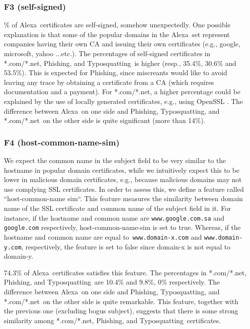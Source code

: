 \documentclass[twocolumn]{article}
\newcommand{\Alexa}{\textsf{Alexa}}
\newcommand{\phishing}{\textsf{Phishing}}
\newcommand{\typosquatting}{\textsf{Typosquatting}}
\newcommand{\comnet}{\textsf{*.com/*.net}}
\begin{document}
\subsubsection*{F3 (self-signed)} \% of \Alexa\
certificates are self-signed, somehow unexpectedly. One possible explanation is that some of the popular domains in 
the  \Alexa\ set represent companies having their own CA and issuing their own certificates (e.g., google, microsoft, yahoo ...etc.).
The percentages of self-signed certificates in \comnet, \phishing, and \typosquatting\ is higher (resp.,  35.4\%, 30.6\% and 53.5\%). 
This is expected for \phishing, since miscreants would like to avoid leaving any trace by obtaining a certificate from a 
CA (which requires documentation and a payment). For \comnet, a higher percentage could be explained  by the use of locally generated certificates, e.g.,  using OpenSSL \cite{openSSL}.
The difference between \Alexa\ on one side and \phishing, \typosquatting, and \comnet\ on the other side is quite significant (more than 14\%). 


\subsubsection*{F4 (host-common-name-sim)}\noindent 
We expect the common name in the subject field to be very similar to the hostname in popular domain certificates, while
we intuitively expect this to be lower in malicious domain certificates, e.g., because malicious domains may not use
complying SSL certificates. In order to assess this, we define a feature called ``host-common-name sim``. This feature 
measures the similarity between domain name of the SSL certificate and common name of the subject field in it.
For instance, if the hostname and common name are \texttt{www.google.com.sa} and \texttt{google.com} respectively, 
host-common-name-sim is set to true. Whereas, if the hostname and common name are equal 
to\texttt{ www.domain-x.com} and \texttt{www.domain-y.com}, respectively, the feature is set to false since domain-x is not equal to domain-y.


74.3\% of \Alexa\
certificates satisfies this feature. The percentages in  \comnet, \phishing, and \typosquatting\ are 10.4\% and 9.8\%, 0\%
respectively. The difference between \Alexa\ on one side and \phishing, \typosquatting, and \comnet\ on the other side is quite remarkable. 
This feature, together with the previous one (excluding bogus subject), suggests that there is some strong similarity among 
\comnet, \phishing, and \typosquatting\ certificates. 
\end{document}
